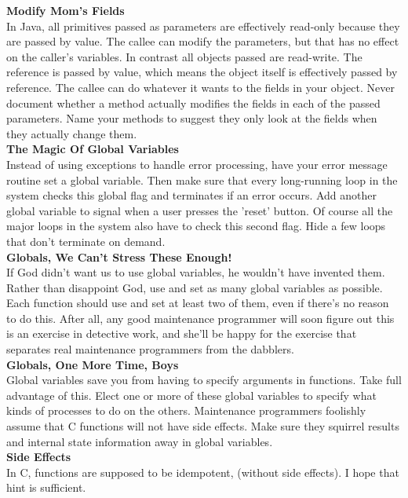 \documentclass[11pt,twoside,a4paper]{article}
\begin{document}
\textbf{Modify Mom's Fields}~\\
In Java, all primitives passed as parameters are effectively read-only because they are passed by value. The callee can modify the parameters, but that has no effect on the caller's variables. In contrast all objects passed are read-write. The reference is passed by value, which means the object itself is effectively passed by reference. The callee can do whatever it wants to the fields in your object. Never document whether a method actually modifies the fields in each of the passed parameters. Name your methods to suggest they only look at the fields when they actually change them.~\\ 

\textbf{The Magic Of Global Variables}~\\
Instead of using exceptions to handle error processing, have your error message routine set a global variable. Then make sure that every long-running loop in the system checks this global flag and terminates if an error occurs. Add another global variable to signal when a user presses the 'reset' button. Of course all the major loops in the system also have to check this second flag. Hide a few loops that don't terminate on demand.~\\ 

\textbf{Globals, We Can't Stress These Enough!}~\\
If God didn't want us to use global variables, he wouldn't have invented them. Rather than disappoint God, use and set as many global variables as possible. Each function should use and set at least two of them, even if there's no reason to do this. After all, any good maintenance programmer will soon figure out this is an exercise in detective work, and she'll be happy for the exercise that separates real maintenance programmers from the dabblers.~\\ 

\textbf{Globals, One More Time, Boys}~\\
Global variables save you from having to specify arguments in functions. Take full advantage of this. Elect one or more of these global variables to specify what kinds of processes to do on the others. Maintenance programmers foolishly assume that C functions will not have side effects. Make sure they squirrel results and internal state information away in global variables.~\\ 

\textbf{Side Effects}~\\
In C, functions are supposed to be idempotent, (without side effects). I hope that hint is sufficient. ~\\
\end{document}

